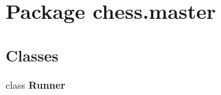 \section{Package chess.\+master}
\label{namespacechess_1_1master}
\subsection*{Classes}
\begin{DoxyCompactItemize}
\item 
class {\bf Runner}
\end{DoxyCompactItemize}
